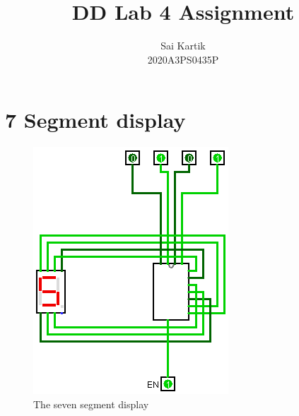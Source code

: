 \documentclass[12pt]{article}
\title{DD Lab 4 Assignment}
\author{Sai Kartik \\2020A3PS0435P}
\begin{document}
\maketitle
\section*{7 Segment display}
\begin{center}
    \begin{figure}[ht]
        \includegraphics[scale=0.5]{sevenseg.png}
        \caption{The seven segment display}
    \end{figure}
\end{center}
\newpage
\end{document}
